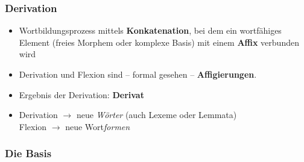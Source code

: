 
\begin{frame}
\frametitle{Derivation}


	\begin{itemize}
		\item Wortbildungsprozess mittels \textbf{Konkatenation}, bei dem ein wortfähiges Element (freies Morphem oder komplexe Basis) mit einem \textbf{Affix} verbunden wird

		\item Derivation und Flexion sind -- formal gesehen -- \textbf{Affigierungen}.
		
		\item Ergebnis der Derivation: \textbf{Derivat}

		\item 	Derivation $\rightarrow$ neue \emph{Wörter} (auch Lexeme oder Lemmata)\\
		Flexion $\rightarrow$ neue Wort\emph{formen}
	
	\end{itemize}
	
\end{frame}



\subsubsection{Die Basis}


